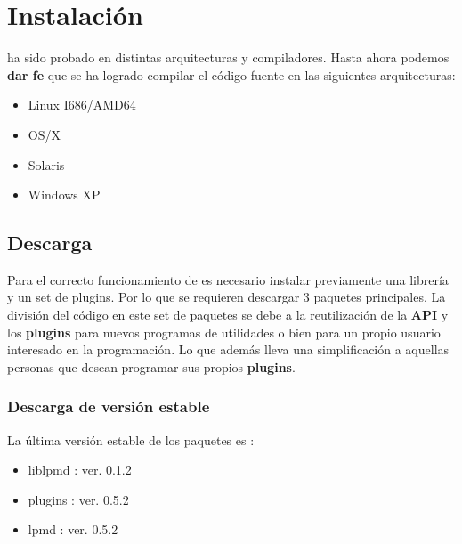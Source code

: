 \chapter{Instalaci\'on}
\label{chap:inst}

\lpmd ha sido probado en distintas arquitecturas y compiladores. Hasta ahora podemos \textbf{dar fe} que se ha logrado compilar el c\'odigo fuente en las siguientes arquitecturas:

\begin{itemize}
 \item Linux I686/AMD64
 \item OS/X
 \item Solaris
 \item Windows XP
\end{itemize}

\section{Descarga}

Para el correcto funcionamiento de \lpmd es necesario instalar previamente una librer\'ia y un set de plugins. Por lo que se requieren descargar 3 paquetes principales. La divisi\'on del c\'odigo en este set de paquetes se debe a la reutilizaci\'on de la \textbf{API} y los \textbf{plugins} para nuevos programas de utilidades o bien para un propio usuario interesado en la programaci\'on. Lo que adem\'as lleva una simplificaci\'on a aquellas personas que desean programar sus propios \textbf{plugins}.

\subsection{Descarga de versi\'on estable}

La \'ultima versi\'on estable de los paquetes es :

\begin{itemize}
 \item liblpmd : ver. 0.1.2
 \item plugins : ver. 0.5.2
 \item lpmd    : ver. 0.5.2
\end{itemize}



